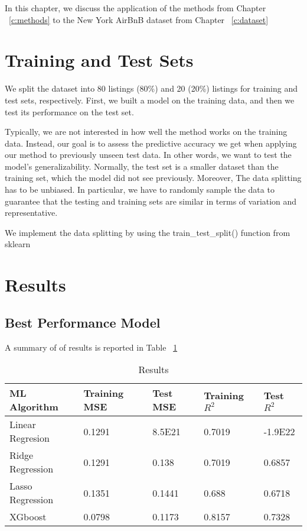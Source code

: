 In this chapter, we discuss the application of the methods from Chapter ~\ref{c:methods}
to the New York AirBnB dataset from Chapter  ~\ref{c:dataset}

\section{Training and Test Sets}
\label{sec:train_test_split}
We split the dataset into 80 listings (80\%) and 20 (20\%) listings for training
and test sets, respectively.  First, we built a model on the training data, and
then we test its performance on the test set.

Typically, we are not interested in how well the method works on the training
data. Instead, our goal is to assess the predictive accuracy we get when
applying our method to previously unseen test data. In other words, we want to
test the model's generalizability.  Normally, the test set is a smaller dataset
than the training set, which the model did not see previously.  Moreover, The
data splitting has to be unbiased. In particular, we have to randomly sample the
data to guarantee that the testing and training sets are similar in terms of
variation and representative.

We implement the data splitting by using the train\_test\_split() function from
sklearn

\section{Results}
\label{sec:results}

\subsection{Best Performance Model}
\label{ssec:cross-validation}

A summary of of results is reported in Table ~\ref{tab:results}

\begin{table}[htpb]
  \centering
  \caption{Results}
  \label{tab:results}
  \begin{tabular}{lllll}
    \hline
    ML Algorithm & Training MSE & Test MSE & Training $R^2$ & Test $R^2$ \\
    \hline
    Linear Regresion & 0.1291 &  8.5E21 &  0.7019 & -1.9E22 \\
    Ridge Regression  & 0.1291 & 0.138 & 0.7019 &  0.6857 \\
    Lasso Regression & 0.1351 & 0.1441 & 0.688 & 0.6718 \\
    XGboost &  0.0798 & 0.1173 & 0.8157 &  0.7328 \\
  \end{tabular}
\end{table}

